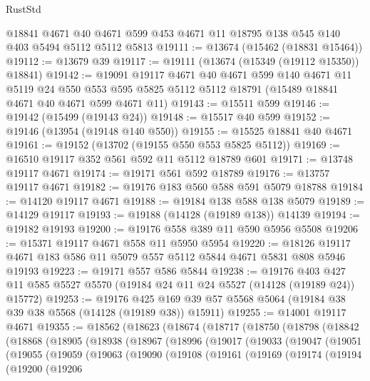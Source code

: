\begin{lexlean}{RustStd}
\begin{coremodule}
    @18841
    @4671
    @40
    @4671
    @599
    @453
    @4671
    @11
    @18795
    @138
    @545
    @140
    @403
    @5494
    @5112
    @5112
    @5813
@19111 := @13674 (@15462 (@18831 @15464))
@19112 := @13679 @39
@19117 := @19111 (@13674 (@15349 (@19112 @15350)) @18841)
@19142 := @19091
    @19117
    @4671
    @40
    @4671
    @599
    @140
    @4671
    @11
    @5119
    @24
    @550
    @553
    @595
    @5825
    @5112
    @5112
    @18791
    (@15489 @18841 @4671 @40 @4671 @599 @4671 @11)
@19143 := @15511 @599
@19146 := @19142 (@15499 (@19143 @24))
@19148 := @15517 @40 @599
@19152 := @19146 (@13954 (@19148 @140 @550))
@19155 := @15525 @18841 @40 @4671
@19161 := @19152 (@13702 (@19155 @550 @553 @5825 @5112))
@19169 := @16510 @19117 @352 @561 @592 @11 @5112 @18789 @601
@19171 := @13748 @19117 @4671
@19174 := @19171 @561 @592 @18789
@19176 := @13757 @19117 @4671
@19182 := @19176 @183 @560 @588 @591 @5079 @18788
@19184 := @14120 @19117 @4671
@19188 := @19184 @138 @588 @138 @5079
@19189 := @14129 @19117
@19193 := @19188 (@14128 (@19189 @138)) @14139
@19194 := @19182 @19193
@19200 := @19176 @558 @389 @11 @590 @5956 @5508
@19206 := @15371 @19117 @4671 @558 @11 @5950 @5954
@19220 := @18126 @19117 @4671 @183 @586 @11 @5079 @557 @5112 @5844 @4671 @5831 @808 @5946 @19193
@19223 := @19171 @557 @586 @5844
@19238 := @19176
    @403
    @427
    @11
    @585
    @5527
    @5570
    (@19184 @24 @11 @24 @5527 (@14128 (@19189 @24)) @15772)
@19253 := @19176
    @425
    @169
    @39
    @57
    @5568
    @5064
    (@19184 @38 @39 @38 @5568 (@14128 (@19189 @38)) @15911)
@19255 := @14001 @19117 @4671
@19355 := @18562
    (@18623
      (@18674
        (@18717
          (@18750
            (@18798
              (@18842
                (@18868
                  (@18905
                    (@18938
                      (@18967
                        (@18996
                          (@19017
                            (@19033
                              (@19047
                                (@19051
                                  (@19055
                                    (@19059
                                      (@19063
                                        (@19090
                                          (@19108
                                            (@19161
                                              (@19169
                                                (@19174
                                                  (@19194
                                                    (@19200
                                                      (@19206

\end{coremodule}
\end{lexlean}
